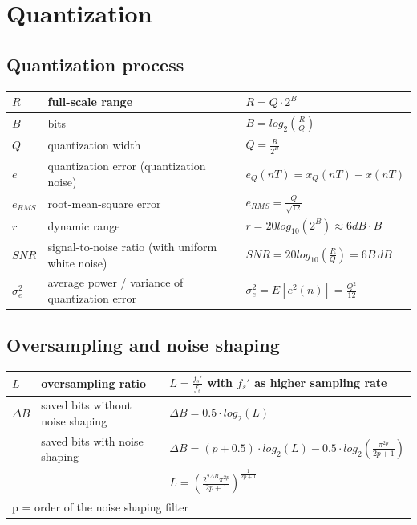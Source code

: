 \section{Quantization}

\subsection{Quantization process}
\begin{tabularx}{\textwidth}{|l|X|X|}
	\hline
	$R$			& full-scale range		& $R = Q \cdot 2^B$
	\\ \hline
	$B$			& bits					& $B = log_2 \left(\frac{R}{Q}\right)$
	\\ \hline
	$Q$			& quantization width	& $Q = \frac{R}{2^B}$
	\\ \hline
	$e$			& quantization error (quantization noise)	& $e_Q(nT) = x_Q(nT) -x(nT)$
	\\ \hline
	$e_{RMS}$	& root-mean-square error & $e_{RMS} = \frac{Q}{\sqrt{12}}$
	\\ \hline
	$r$	        & dynamic range         & $r = 20 log_{10}\left(2^B\right) \approx 6dB \cdot B$
	\\ \hline
	$SNR$		& signal-to-noise ratio (with uniform white noise)	& $SNR = 20 log_{10}\left(\frac{R}{Q}\right) = 6B\, dB$
	\\ \hline
	$\sigma_e^2$& average power / variance of quantization error & $\sigma_e^2 = E[e^2(n)] = \frac{Q^2}{12}$
	\\ \hline
\end{tabularx}


\subsection{Oversampling and noise shaping}
\begin{tabularx}{0.75\textwidth}{|l|l|X|}
	\hline
	$L$	& oversampling ratio	& $L = \frac{f_s'}{f_s}$ with $f_s'$ as higher sampling rate
	\\ \hline
	$\Delta B$	& saved bits without noise shaping	& $\Delta B = 0.5 \cdot log_2(L)$ \\
				& saved bits with noise shaping		& $\Delta B = (p + 0.5) \cdot log_2(L) - 0.5 \cdot log_2\left(\frac{\pi^{2p}}{2p + 1}\right)$ \\
				& & $L = \left(\frac{2^{2\Delta B} \pi^{2p}}{2p+1}\right)^{\frac{1}{2p+1}}$	
	\\ \hline
	\multicolumn{3}{l}{p = order of the noise shaping filter}
\end{tabularx}

